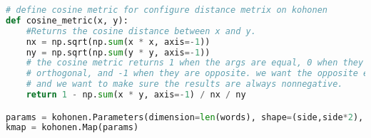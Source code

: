 \begin{lstlisting}[language=python]
# define cosine metric for configure distance metrix on kohonen
def cosine_metric(x, y):
	#Returns the cosine distance between x and y.
	nx = np.sqrt(np.sum(x * x, axis=-1))
	ny = np.sqrt(np.sum(y * y, axis=-1))
	# the cosine metric returns 1 when the args are equal, 0 when they are
	# orthogonal, and -1 when they are opposite. we want the opposite effect,
	# and we want to make sure the results are always nonnegative.
	return 1 - np.sum(x * y, axis=-1) / nx / ny

params = kohonen.Parameters(dimension=len(words), shape=(side,side*2), metric=cosine_metric)
kmap = kohonen.Map(params)
\end{lstlisting}






